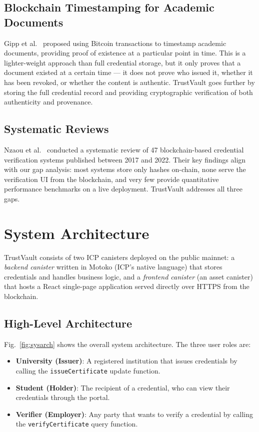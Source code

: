 \documentclass[journal]{IEEEtran}
\begin{document}
\subsection{Blockchain Timestamping for Academic Documents}

Gipp et al.~\cite{gipp2015decentralized} proposed using Bitcoin transactions to timestamp academic documents, providing proof of existence at a particular point in time. This is a lighter-weight approach than full credential storage, but it only proves that a document existed at a certain time — it does not prove who issued it, whether it has been revoked, or whether the content is authentic. TrustVault goes further by storing the full credential record and providing cryptographic verification of both authenticity and provenance.

\subsection{Systematic Reviews}

Nzaou et al.~\cite{nzaou2022credential} conducted a systematic review of 47 blockchain-based credential verification systems published between 2017 and 2022. Their key findings align with our gap analysis: most systems store only hashes on-chain, none serve the verification UI from the blockchain, and very few provide quantitative performance benchmarks on a live deployment. TrustVault addresses all three gaps.

\section{System Architecture}
\label{sec:architecture}

TrustVault consists of two ICP canisters deployed on the public mainnet: a \emph{backend canister} written in Motoko (ICP's native language) that stores credentials and handles business logic, and a \emph{frontend canister} (an asset canister) that hosts a React single-page application served directly over HTTPS from the blockchain.

\subsection{High-Level Architecture}

Fig.~\ref{fig:sysarch} shows the overall system architecture. The three user roles are:

\begin{itemize}[leftmargin=*]
  \item \textbf{University (Issuer)}: A registered institution that issues credentials by calling the \texttt{issueCertificate} update function.
  \item \textbf{Student (Holder)}: The recipient of a credential, who can view their credentials through the portal.
  \item \textbf{Verifier (Employer)}: Any party that wants to verify a credential by calling the \texttt{verifyCertificate} query function.
\end{itemize}
\end{document}
